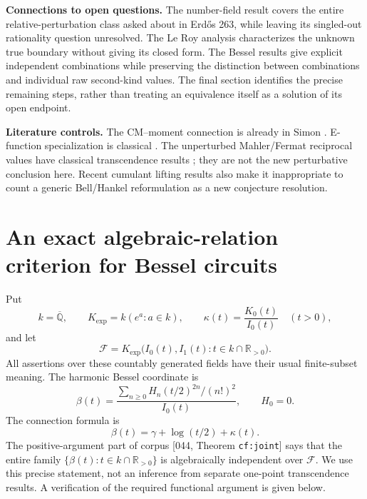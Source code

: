 \documentclass[11pt,a4paper]{article}
\theoremstyle{definition}
\theoremstyle{remark}
\numberwithin{equation}{section}
\begin{document}
\textbf{Connections to open questions.}
The number-field result covers the entire relative-perturbation class
asked about in Erd\H{o}s 263, while leaving its singled-out rationality
question unresolved. The Le Roy analysis characterizes the unknown
true boundary without giving its closed form. The Bessel results
give explicit independent combinations while preserving the distinction
between combinations and individual raw second-kind values. The final
section identifies the precise remaining steps, rather than treating
an equivalence itself as a solution of its open endpoint.

\textbf{Literature controls.}
The CM--moment connection is already in Simon \cite{Simon2021}.
E-function specialization is classical \cite{Beukers2006}.
The unperturbed Mahler/Fermat reciprocal values have classical
transcendence results \cite{Coons2011,AdamczewskiFaverjon2023};
they are not the new perturbative conclusion here. Recent cumulant
lifting results \cite{Zhu2026} also make it inappropriate to count a
generic Bell/Hankel reformulation as a new conjecture resolution.


\providecommand{\arbQbar}{\overline{\mathbb Q}}
\providecommand{\arbKexp}{K_{\mathrm{exp}}}
\providecommand{\arbkap}{\kappa}

\section{An exact algebraic-relation criterion for Bessel circuits}
\label{arb:circuits}

Put
\[
 k=\arbQbar,\qquad
 \arbKexp=k(e^a:a\in k),\qquad
 \arbkap(t)=\frac{K_0(t)}{I_0(t)}\quad(t>0),
\]
and let
\[
 \mathcal F=\arbKexp\bigl(I_0(t),I_1(t):
                         t\in k\cap\mathbb R_{>0}\bigr).
\]
All assertions over these countably generated fields have their usual
finite-subset meaning.  The harmonic Bessel coordinate is
\[
 \beta(t)=
 \frac{\displaystyle\sum_{n\geq0}
           H_n(t/2)^{2n}/(n!)^2}{I_0(t)},
 \qquad H_0=0.
\]
The connection formula is
\begin{equation}\label{arb:connection}
 \beta(t)=\gamma+\log(t/2)+\arbkap(t).
\end{equation}
The positive-argument part of corpus [044, Theorem
\texttt{cf:joint}] says that the entire family
\(\{\beta(t):t\in k\cap\mathbb R_{>0}\}\) is algebraically
independent over \(\mathcal F\).  We use this precise statement,
not an inference from separate one-point transcendence results.
A verification of the required functional argument is given below.
\end{document}
